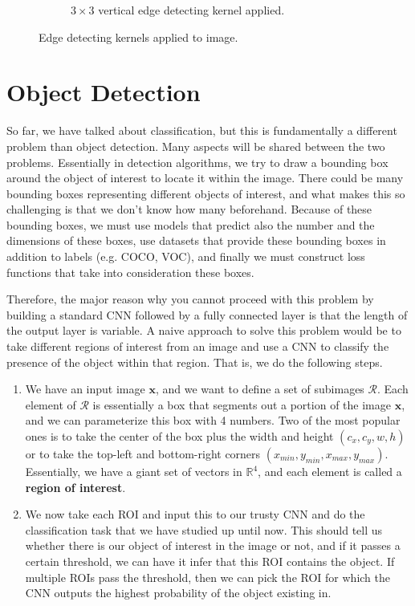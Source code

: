 \documentclass{article}
\begin{document}
\begin{example}
\begin{figure}[H]
\begin{subfigure}[b]{0.45\textwidth}
              \caption{$3 \times 3$ vertical edge detecting kernel applied. }
              \label{fig:Vertical}
          \end{subfigure}

          \label{fig:horizontal_vertical}
          \caption{Edge detecting kernels applied to image. }
      \end{figure}
    \end{example}

\section{Object Detection} 

  So far, we have talked about classification, but this is fundamentally a different problem than object detection. Many aspects will be shared between the two problems. Essentially in detection algorithms, we try to draw a bounding box around the object of interest to locate it within the image. There could be many bounding boxes representing different objects of interest, and what makes this so challenging is that we don't know how many beforehand. Because of these bounding boxes, we must use models that predict also the number and the dimensions of these boxes, use datasets that provide these bounding boxes in addition to labels (e.g. COCO, VOC), and finally we must construct loss functions that take into consideration these boxes. 

  Therefore, the major reason why you cannot proceed with this problem by building a standard CNN followed by a fully connected layer is that the length of the output layer is variable. A naive approach to solve this problem would be to take different regions of interest from an image and use a CNN to classify the presence of the object within that region. That is, we do the following steps. 
  \begin{enumerate}
    \item We have an input image $\mathbf{x}$, and we want to define a set of subimages $\mathcal{R}$. Each element of $\mathcal{R}$ is essentially a box that segments out a portion of the image $\mathbf{x}$, and we can parameterize this box with 4 numbers. Two of the most popular ones is to take the center of the box plus the width and height $(c_x, c_y, w, h)$ or to take the top-left and bottom-right corners $(x_{min}, y_{min}, x_{max}, y_{max})$. Essentially, we have a giant set of vectors in $\mathbb{R}^4$, and each element is called a \textbf{region of interest}. 
    \item We now take each ROI and input this to our trusty CNN and do the classification task that we have studied up until now. This should tell us whether there is our object of interest in the image or not, and if it passes a certain threshold, we can have it infer that this ROI contains the object. If multiple ROIs pass the threshold, then we can pick the ROI for which the CNN outputs the highest probability of the object existing in.  
  \end{enumerate}
\end{document}
